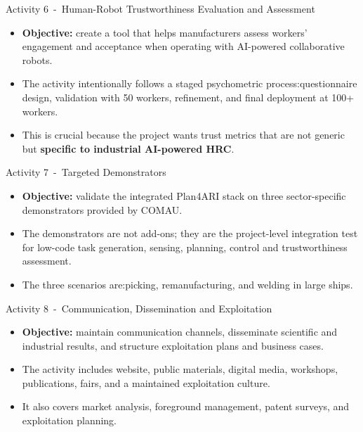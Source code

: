 \documentclass[aspectratio=169,10pt]{beamer}
\begin{document}
\begin{frame}{Activity 6~-~Human-Robot Trustworthiness Evaluation and Assessment}

\small
\begin{itemize}
  \item \textbf{Objective:} create a tool that helps manufacturers assess workers' engagement and acceptance when operating with AI-powered collaborative robots.
  \item The activity intentionally follows a staged psychometric process:\@initial questionnaire design, validation with 50 workers, refinement, and final deployment at 100+ workers.
  \item This is crucial because the project wants trust metrics that are not generic but \textbf{specific to industrial AI-powered HRC}. 
\end{itemize}

\end{frame}


\begin{frame}{Activity 7~-~Targeted Demonstrators}

\small
\begin{itemize}
  \item \textbf{Objective:} validate the integrated Plan4ARI stack on three sector-specific demonstrators provided by COMAU.\@
  \item The demonstrators are not add-ons; they are the project-level integration test for low-code task generation, sensing, planning, control and trustworthiness assessment.
  \item The three scenarios are:\@warehouse picking, remanufacturing, and welding in large ships.
\end{itemize}

\end{frame}


\begin{frame}{Activity 8~-~Communication, Dissemination and Exploitation}

\small
\begin{itemize}
  \item \textbf{Objective:} maintain communication channels, disseminate scientific and industrial results, and structure exploitation plans and business cases.
  \item The activity includes website, public materials, digital media, workshops, publications, fairs, and a maintained exploitation culture.
  \item It also covers market analysis, foreground management, patent surveys, and exploitation planning.
\end{itemize}

\end{frame}
\end{document}
